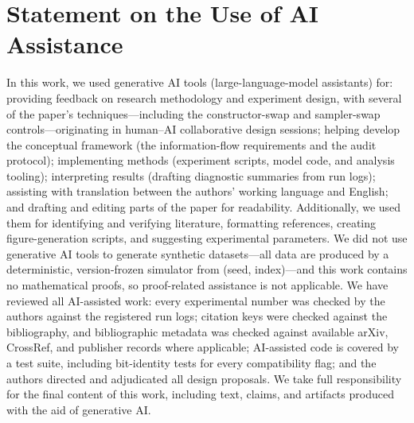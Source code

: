 \documentclass[11pt]{article}
\begin{document}
\section*{Statement on the Use of AI Assistance}
In this work, we used generative AI tools (large-language-model assistants)
for: providing feedback on research methodology and experiment design, with
several of the paper's techniques---including the constructor-swap and
sampler-swap controls---originating in human--AI collaborative design
sessions; helping develop the conceptual framework (the information-flow
requirements and the audit protocol); implementing methods (experiment scripts,
model code, and analysis tooling); interpreting results (drafting diagnostic
summaries from run logs); assisting with translation between the authors'
working language and English; and drafting and editing parts of the paper for
readability. Additionally, we used them for identifying and verifying
literature, formatting references, creating figure-generation scripts, and
suggesting experimental parameters. We did not use generative AI tools to
generate synthetic datasets---all data are produced by a deterministic,
version-frozen simulator from (seed, index)---and this work contains no
mathematical proofs, so proof-related assistance is not applicable. We have
reviewed all AI-assisted work: every experimental number was checked by the
authors against the registered run logs; citation keys were checked against
the bibliography, and bibliographic metadata was checked against available
arXiv, CrossRef, and publisher records where applicable; AI-assisted code is
covered by a test suite, including bit-identity tests for every compatibility
flag; and the authors directed and adjudicated all design proposals. We take
full responsibility for the final content of this work, including text,
claims, and artifacts produced with the aid of generative AI.


\clearpage
\end{document}
